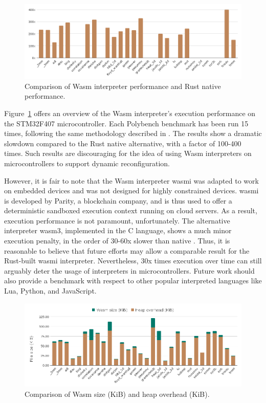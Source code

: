 \begin{figure}[ht]
\centering
\includegraphics[width=\columnwidth]{figures/b-wasmi-4}
\caption{Comparison of Wasm interpreter performance and Rust native performance.} \label{fig:b-wasmi-4}
\end{figure}

Figure~\ref{fig:b-wasmi-4} offers an overview of the Wasm interpreter's execution performance on the STM32F407 microcontroller. Each Polybench benchmark has been run 15 times, following the same methodology described in \cite{wasm3-performance}. The results show a dramatic slowdown compared to the Rust native alternative, with a factor of 100-400 times. Such results are discouraging for the idea of using Wasm interpreters on microcontrollers to support dynamic reconfiguration.

However, it is fair to note that the Wasm interpreter wasmi \cite{wasmi} was adapted to work on embedded devices and was not designed for highly constrained devices. wasmi is developed by Parity, a blockchain company, and is thus used to offer a deterministic sandboxed execution context running on cloud servers. As a result, execution performance is not paramount, unfortunately. The alternative interpreter wasm3, implemented in the C language, shows a much minor execution penalty, in the order of 30-60x slower than native \cite{peach2020ewasm}. Thus, it is reasonable to believe that future efforts may allow a comparable result for the Rust-built wasmi interpreter. Nevertheless, 30x times execution over time can still arguably deter the usage of interpreters in microcontrollers. Future work should also provide a benchmark with respect to other popular interpreted languages like Lua, Python, and JavaScript.

\begin{figure}[ht]
\centering
\includegraphics[width=\columnwidth]{figures/b-wasmi-1}
\caption{Comparison of Wasm size (KiB) and heap overhead (KiB).}
\label{fig:b-wasmi-1}
\end{figure}

